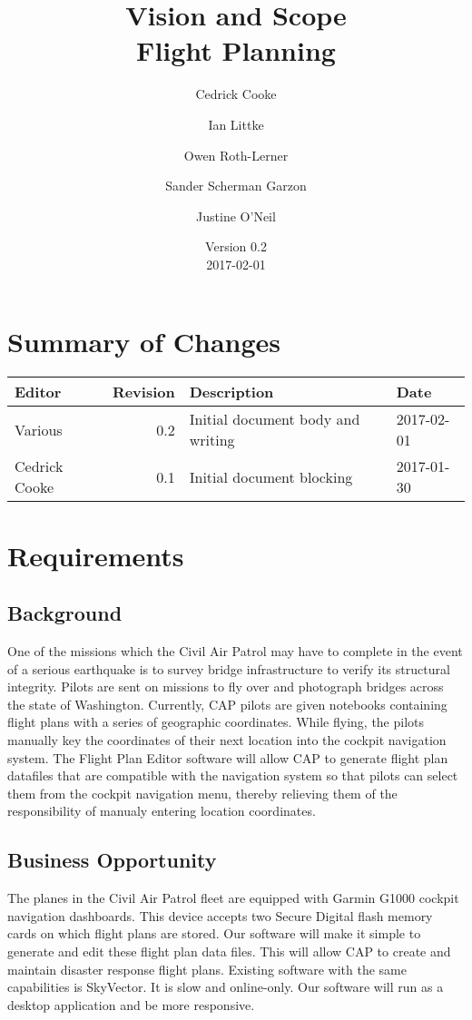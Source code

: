 \documentclass[12pt, letterpaper]{article}
\title{Vision and Scope \\
Flight Planning
}
\author{ Cedrick Cooke
    \and Ian Littke
    \and Owen Roth-Lerner
    \and Sander Scherman Garzon
    \and Justine O'Neil
}
\date{Version 0.2 \\ 2017-02-01}
\begin{document}
\maketitle

\tableofcontents

\section*{Summary of Changes}
\begin{tabularx}{\textwidth}{|l|r|X|l|}
\hline
Editor & Revision & Description & Date \\ \hline \hline
Various & 0.2 & Initial document body and writing & 2017-02-01 \\ \hline
Cedrick Cooke & 0.1 & Initial document blocking & 2017-01-30 \\ \hline
\end{tabularx}

\section{Requirements}
\subsection{Background}
One of the missions which the Civil Air Patrol may have to complete in the event of a serious earthquake is to survey bridge infrastructure to verify its structural integrity.  Pilots are sent on missions to fly over and photograph bridges across the state of Washington.  Currently, CAP pilots are given notebooks containing flight plans with a series of geographic coordinates.  While flying, the pilots manually key the coordinates of their next location into the cockpit navigation system.  The Flight Plan Editor software will allow CAP to generate flight plan datafiles that are compatible with the navigation system so that pilots can select them from the cockpit navigation menu, thereby relieving them of the responsibility of manualy entering location coordinates.

\subsection{Business Opportunity}
The planes in the Civil Air Patrol fleet are equipped with Garmin G1000 cockpit navigation dashboards.  This device accepts two Secure Digital flash memory cards on which flight plans are stored.  Our software will make it simple to generate and edit these flight plan data files.  This will allow CAP to create and maintain disaster response flight plans.  Existing software with the same capabilities is SkyVector.  It is slow and online-only.  Our software will run as a desktop application and be more responsive.
\end{document}
